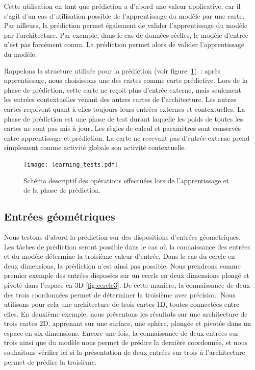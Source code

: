 \documentclass[../main]{subfiles}
\begin{document}
Cette utilisation en tant que prédiction a d'abord une valeur applicative, car il s'agit d'un cas d'utilisation possible de l'apprentissage du modèle par une carte. Par ailleurs, la prédiction permet également de valider l'apprentissage du modèle par l'architecture. Par exemple, dans le cas de données réelles, le modèle d'entrée n'est pas forcément connu. La prédiction permet alors de valider l'apprentissage du modèle.

Rappelons la structure utilisée pour la prédiction (voir figure~\ref{fig:schema_pred})~: après apprentissage, nous choisissons une des cartes comme carte prédictive. Lors de la phase de prédiction, cette carte ne reçoit plus d'entrée externe, mais seulement les entrées contextuelles venant des autres cartes de l'architecture. 
Les autres cartes reçoivent quant à elles toujours leurs entrées externes et contextuelles. La phase de prédiction est une phase de test durant laquelle les poids de toutes les cartes ne sont pas mis à jour. Les règles de calcul et paramètres sont conservés entre apprentissage et prédiction. La carte ne recevant pas d'entrée externe prend simplement comme activité globale son activité contextuelle.

\begin{figure}
	\texttt{[image: learning\_tests.pdf]}
	\caption{Schéma descriptif des opérations effectuées lors de l'apprentissage et de la phase de prédiction.\label{fig:schema_pred}}
\end{figure}


\subsection{Entrées géométriques}

Nous testons d'abord la prédiction sur des dispositions d'entrées géométriques.
Les tâches de prédiction seront possible dans le cas où la connaissance des entrées et du modèle détermine la troisième valeur d'entrée. Dans le cas du cercle en deux dimensions, la prédiction n'est ainsi pas possible.
Nous prendrons comme premier exemple des entrées disposées sur un cercle en deux dimensions plongé et pivoté dans l'espace en 3D \ref{fig:cercle3}. De cette manière, la connaissance de deux des trois coordonnées permet de déterminer la troisième avec précision.
Nous utilisons pour cela une architecture de trois cartes 1D, toutes connectées entre elles.  
En deuxième exemple, nous présentons les résultats sur une architecture de trois cartes 2D, apprenant sur une surface, une sphère, plongée et pivotée dans un espace en six dimensions. Encore une fois, la connaissance de deux entrées sur trois ainsi que du modèle nous permet de prédire la dernière coordonnée, et nous souhaitons vérifier ici si la présentation de deux entrées sur trois à l'architecture permet de prédire la troisième.
\end{document}
